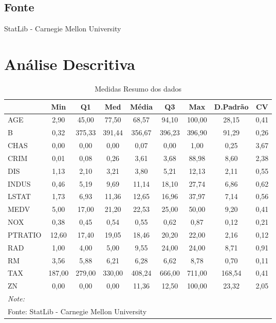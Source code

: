 \documentclass[
  letterpaper,
]{report}
\begin{document}
\hypertarget{fonte}{%
\subsection{Fonte}\label{fonte}}

StatLib - Carnegie Mellon University

\newpage

\hypertarget{anuxe1lise-descritiva}{%
\section{Análise Descritiva}\label{anuxe1lise-descritiva}}

\begin{table}[H]

\caption{Medidas Resumo dos dados}
\centering
\begin{tabular}[t]{l|c|c|c|c|c|c|c|c}
\hline
  & Min & Q1 & Med & Média & Q3 & Max & D.Padrão & CV\\
\hline
AGE & 2,90 & 45,00 & 77,50 & 68,57 & 94,10 & 100,00 & 28,15 & 0,41\\
\hline
B & 0,32 & 375,33 & 391,44 & 356,67 & 396,23 & 396,90 & 91,29 & 0,26\\
\hline
CHAS & 0,00 & 0,00 & 0,00 & 0,07 & 0,00 & 1,00 & 0,25 & 3,67\\
\hline
CRIM & 0,01 & 0,08 & 0,26 & 3,61 & 3,68 & 88,98 & 8,60 & 2,38\\
\hline
DIS & 1,13 & 2,10 & 3,21 & 3,80 & 5,21 & 12,13 & 2,11 & 0,55\\
\hline
INDUS & 0,46 & 5,19 & 9,69 & 11,14 & 18,10 & 27,74 & 6,86 & 0,62\\
\hline
LSTAT & 1,73 & 6,93 & 11,36 & 12,65 & 16,96 & 37,97 & 7,14 & 0,56\\
\hline
MEDV & 5,00 & 17,00 & 21,20 & 22,53 & 25,00 & 50,00 & 9,20 & 0,41\\
\hline
NOX & 0,38 & 0,45 & 0,54 & 0,55 & 0,62 & 0,87 & 0,12 & 0,21\\
\hline
PTRATIO & 12,60 & 17,40 & 19,05 & 18,46 & 20,20 & 22,00 & 2,16 & 0,12\\
\hline
RAD & 1,00 & 4,00 & 5,00 & 9,55 & 24,00 & 24,00 & 8,71 & 0,91\\
\hline
RM & 3,56 & 5,88 & 6,21 & 6,28 & 6,62 & 8,78 & 0,70 & 0,11\\
\hline
TAX & 187,00 & 279,00 & 330,00 & 408,24 & 666,00 & 711,00 & 168,54 & 0,41\\
\hline
ZN & 0,00 & 0,00 & 0,00 & 11,36 & 12,50 & 100,00 & 23,32 & 2,05\\
\hline
\multicolumn{9}{l}{\rule{0pt}{1em}\textit{Note: }}\\
\multicolumn{9}{l}{\rule{0pt}{1em}Fonte: StatLib - Carnegie Mellon University}\\
\end{tabular}
\end{table}
\end{document}
